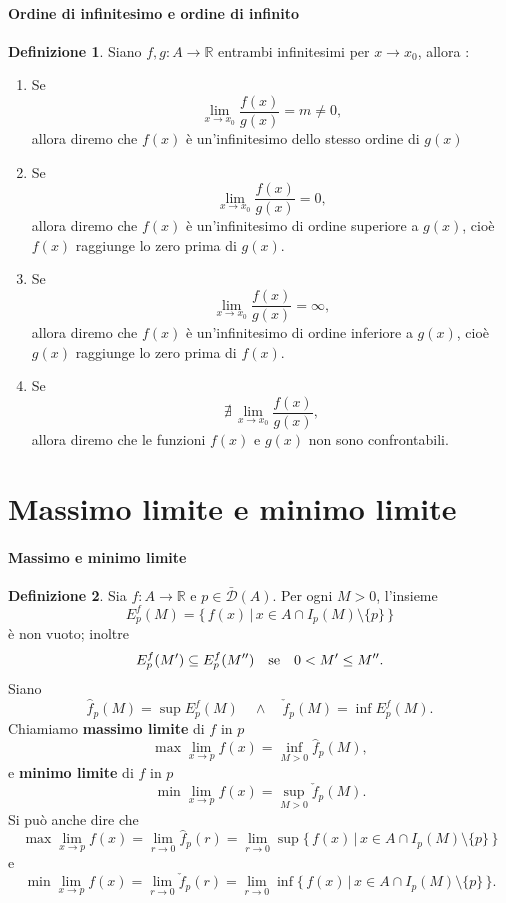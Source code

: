\documentclass{article}
\theoremstyle{plain}
\theoremstyle{definition}
\newtheorem{defn}{Definizione}[section]
\theoremstyle{remark}
\begin{document}
\paragraph{Ordine di infinitesimo e ordine di infinito}
\begin{bxthm}
\begin{defn}
    Siano $f,g:A\to\mathbb{R}$ entrambi infinitesimi per $x\to x_0$, allora :
\begin{enumerate}
    \item Se \[\lim_{x\to x_0}\dfrac{f(x)}{g(x)}=m\neq0,\] allora diremo che $f(x)$ è un'infinitesimo dello stesso ordine di $g(x)$
    \item Se \[\lim_{x\to x_0}\dfrac{f(x)}{g(x)}=0,\] allora diremo che $f(x)$ è un'infinitesimo di ordine superiore a $g(x)$, cioè $f(x)$ raggiunge lo zero prima di $g(x)$.
    \item Se \[\lim_{x\to x_0}\dfrac{f(x)}{g(x)}=\infty,\] allora diremo che $f(x)$ è un'infinitesimo di ordine inferiore a $g(x)$, cioè $g(x)$ raggiunge lo zero prima di $f(x)$.
    \item Se \[\nexists\,\lim_{x\to x_0}\dfrac{f(x)}{g(x)},\] allora diremo che le funzioni $f(x)$ e $g(x)$ non sono confrontabili.
\end{enumerate}
\end{defn}
\end{bxthm}

\vspace{50pt}
\section{Massimo limite e minimo limite}
\vspace{50pt}

\paragraph{Massimo e minimo limite}
\begin{bxthm}
\begin{defn}
    Sia $f:A\to\mathbb{R}$ e $p\in\bar{\mathcal{D}}(A)$.
Per ogni $M>0$, l'insieme
\[E_p^f(M)=\{\,f(x)\,|\,x\in A\cap I_p(M)\setminus\{p\}\,\}\]
è non vuoto; inoltre \[E_p^f(M')\subseteq E_p^f(M'')\quad\textup{se}\quad 0<M'\leq M''. \]
Siano
\[\hat{f}_p(M)=\sup E_p^f(M)\quad\land\quad\check{f}_p(M)=\inf E_p^f(M).\]
Chiamiamo \textbf{massimo limite} di $f$ in $p$
\[\max\lim_{x\to p}f(x)=\inf_{M>0}\hat{f}_p(M),\]
e \textbf{minimo limite} di $f$ in $p$
\[\min\lim_{x\to p}f(x)=\sup_{M>0}\check{f}_p(M).\]
Si può anche dire che 
\[
    \max\lim_{x\to p}f(x)=\lim_{r\to0}\hat{f}_p(r)=\lim_{r\to0}\sup\{\,f(x)\,|\,x\in A\cap I_p(M)\setminus\{p\}\,\}
\]
e 
\[
    \min\lim_{x\to p}f(x)=\lim_{r\to0}\check{f}_p(r)=\lim_{r\to0}\inf\{\,f(x)\,|\,x\in A\cap I_p(M)\setminus\{p\}\,\}.
\]
\end{defn}
\end{bxthm}
\end{document}
